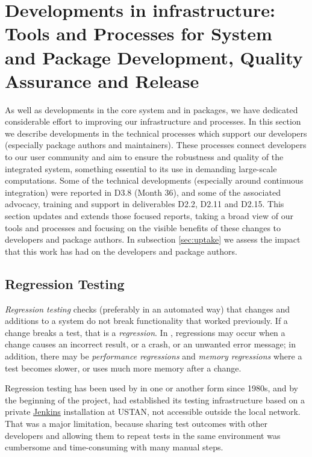 \section{Developments in \GAP infrastructure: Tools and Processes for
  System and Package Development, Quality Assurance and Release }\label{sec:gap-infra}

As well as developments in the core system and in packages, we have
dedicated considerable effort to improving our infrastructure and
processes.  In this section we describe developments in the technical
processes which support our developers (especially package
authors and maintainers). 
These processes connect developers to our user community and aim to ensure the
robustness and quality of the integrated system, something essential
to its use in demanding large-scale computations. Some of the
technical developments (especially around continuous integration) were
reported in D3.8 (Month 36), and some of the associated advocacy,
training and support in deliverables D2.2, D2.11 and D2.15. This
section updates and extends those focused reports, taking a broad
view of our tools and processes and focusing on the visible benefits
of these changes to developers and package authors. In subsection
\ref{sec:uptake} we assess the impact that this work has
had on the developers and package authors.

\subsection{Regression Testing}\label{testing}

\emph{Regression testing} %
checks (preferably in an automated way)
that changes and additions to a system do not break functionality that 
worked previously. If a change breaks a test, that is 
a \emph{regression}. In \GAP, regressions may occur
when a change causes an incorrect result, or a crash, or an unwanted error
message; in addition, there may be \emph{performance regressions}
and \emph{memory regressions} where a test becomes slower, or uses
much more memory after a change.

Regression testing has been used by \GAP in one or another form since 
1980s, and by the beginning of the \ODK project, \GAP had established its testing infrastructure
based on a private \href{https://jenkins.io/}{\sf Jenkins} installation
at USTAN, not accessible outside the local network. That was a major limitation,
because sharing test outcomes with other developers and
allowing them to repeat tests in the same environment was cumbersome
and time-consuming with many manual steps.

